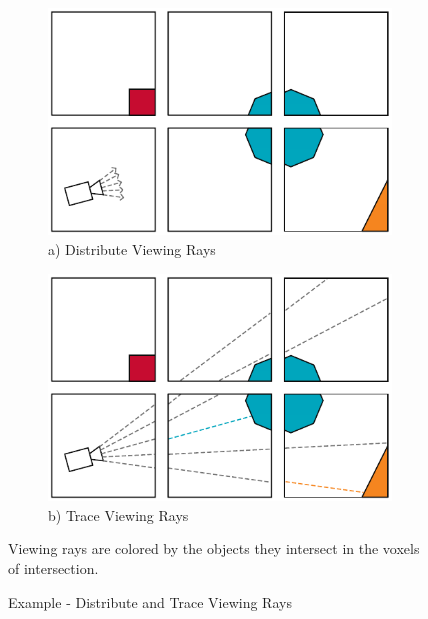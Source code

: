 \begin{figure}[!htb]
\centering
\begin{subfigure}{.49\columnwidth}
 \centering
  \includegraphics[width=.98\columnwidth]{drawings/examples/Trace1.pdf}
  a) Distribute Viewing Rays
\end{subfigure}
\begin{subfigure}{.49\columnwidth}
 \centering
  \includegraphics[width=.98\columnwidth]{drawings/examples/Trace2.pdf}
  b) Trace Viewing Rays
\end{subfigure}
\begin{flushleft}\caption{Example - Distribute and Trace Viewing Rays}{Viewing
rays are colored by the objects they intersect in the voxels of
intersection.}%
\label{fig:trace}
\end{flushleft}
\end{figure}












